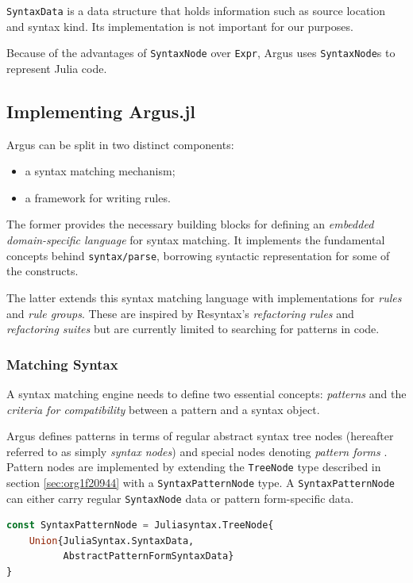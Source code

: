 \documentclass{juliacon}
\begin{document}
\texttt{SyntaxData} is a data structure that holds information such as source
location and syntax kind. Its implementation is not important for our
purposes.

Because of the advantages of \texttt{SyntaxNode} over \texttt{Expr}, Argus uses
\texttt{SyntaxNode}s to represent Julia code.

\subsection{Implementing Argus.jl}
\label{sec:orgaa377d4}

Argus can be split in two distinct components:

\begin{itemize}
\item a syntax matching mechanism;
\item a framework for writing rules.
\end{itemize}

The former provides the necessary building blocks for defining an
\emph{embedded domain-specific language} for syntax
matching. It implements the fundamental concepts behind
\texttt{syntax/parse}, borrowing syntactic representation for some of the
constructs.

The latter extends this syntax matching language with implementations
for \emph{rules} and \emph{rule groups}. These are inspired by Resyntax's
\emph{refactoring rules} and \emph{refactoring suites} but are currently limited
to searching for patterns in code.

\subsubsection{Matching Syntax}
\label{sec:orgc7e5599}

A syntax matching engine needs to define two essential concepts:
\emph{patterns} and the \emph{criteria for compatibility} between a pattern and
a syntax object.

Argus defines patterns in terms of regular abstract syntax tree nodes
(hereafter referred to as simply \emph{syntax nodes}) and special nodes
denoting \emph{pattern forms} \cite{pattern_forms}. Pattern nodes are
implemented by extending the \texttt{TreeNode} type described in section
\ref{sec:org1f20944} with a \texttt{SyntaxPatternNode} type. A
\texttt{SyntaxPatternNode} can either carry regular \texttt{SyntaxNode} data or
pattern form-specific data.

\begin{lstlisting}[language=Julia]
const SyntaxPatternNode = Juliasyntax.TreeNode{
    Union{JuliaSyntax.SyntaxData,
          AbstractPatternFormSyntaxData}
}
\end{lstlisting}
\end{document}
